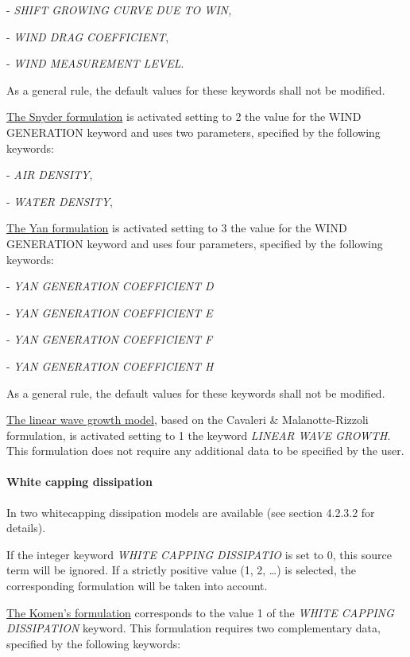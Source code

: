 - \textit{SHIFT GROWING CURVE DUE TO WIN,} 

- \textit{WIND DRAG COEFFICIENT},  

- \textit{WIND MEASUREMENT LEVEL}.  

  \textit{}

As a general rule, the default values for these keywords shall not be modified.

 \underline{ The Snyder formulation} is activated setting to 2 the value for the WIND GENERATION keyword and uses two parameters, specified by the following keywords:   

- \textit{AIR DENSITY},   

- \textit{WATER DENSITY},

   \textit{}

\underline{ The Yan formulation} is activated setting to 3 the value for the WIND GENERATION keyword and uses four parameters, specified by the following keywords:   

- \textit{YAN GENERATION COEFFICIENT D}  

- \textit{YAN GENERATION COEFFICIENT E} 

- \textit{YAN GENERATION COEFFICIENT F} 

- \textit{YAN GENERATION COEFFICIENT H}

  \textit{}

As a general rule, the default values for these keywords shall not be modified.

\underline{  The linear wave growth model}, based on the Cavaleri \& Malanotte-Rizzoli formulation, is activated setting to 1 the keyword \textit{LINEAR WAVE GROWTH}. This formulation does not require any additional data to be specified by the user.


\paragraph{ White capping dissipation}

 In \tomawac two whitecapping dissipation models are available (see section 4.2.3.2 for details).

 If the integer keyword \textit{WHITE CAPPING DISSIPATIO} is set to 0, this source term will be ignored. If a strictly positive value (1, 2, \dots ) is selected, the corresponding formulation will be taken into account.

 \underline{  The Komen's formulation} corresponds to the value 1 of the \textit{WHITE CAPPING DISSIPATION} keyword. This formulation requires two complementary data, specified by the following keywords:   

